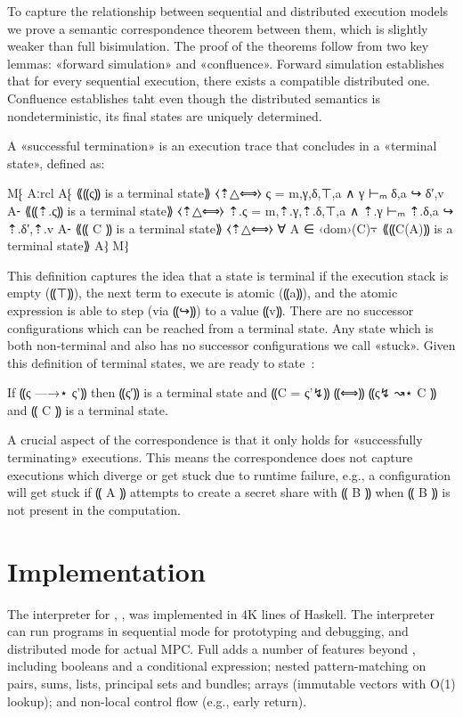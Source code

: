 To capture the relationship between sequential and distributed execution
models we prove a semantic correspondence theorem between them, which is
slightly weaker than full bisimulation. The proof of the theorems follow
from two key lemmas: «forward simulation» and «confluence». Forward simulation
establishes that for every sequential execution, there exists a compatible distributed
one. Confluence establishes taht even though the distributed semantics is nondeterministic,
its final states are uniquely determined.

A «successful termination» is an execution trace that
concludes in a «terminal state», defined as:

M⁅ Aːrcl
   A⁅ ⟪⸨ς⸩ is a terminal state⟫   ⧼⇡△⟺⧽ ς = m,γ,δ,⊤,a ∧ γ ⊢ₘ δ,a ↪ δ′,v
   A⁃ ⟪⸨⇡.ς⸩ is a terminal state⟫ ⧼⇡△⟺⧽ ⇡.ς = m,⇡.γ,⇡.δ,⊤,a ∧ ⇡.γ ⊢ₘ ⇡.δ,a ↪ ⇡.δ′,⇡.v
   A⁃ ⟪⸨ C ⸩ is a terminal state⟫   ⧼⇡△⟺⧽ ∀ A ∈ ‹dom›(C)⍪ ⟪⸨C(A)⸩ is a terminal state⟫
   A⁆
   M⁆

This definition captures the idea that a state is terminal if the execution
stack is empty (⸨⊤⸩), the next term to execute is atomic (⸨a⸩), and the
atomic expression is able to step (via ⸨↪⸩) to a value ⸨v⸩.
There are no successor configurations which can be reached from a terminal state. Any
state which is both non-terminal and also has no successor configurations we
call «stuck». Given this definition of terminal states, we are ready to
state~:

\begin{theorem}\label{thm:mpc-simulation}
  If ⸨ς —→⋆ ς'⸩ then ⸨ς′⸩ is a terminal state and ⸨C = ς'↯⸩ ⸨⟺⸩ ⸨ς↯ ↝⋆ C ⸩ and ⸨ C ⸩ is a terminal state.
\end{theorem}

A crucial aspect of the correspondence is that it only
holds for «successfully terminating» executions. This means the correspondence
 does not capture executions which diverge or get stuck due to runtime failure,
 e.g., a configuration will get stuck if ⸨ A ⸩ attempts to create a secret share
 with ⸨ B ⸩ when ⸨ B ⸩ is not present in the computation.

\section{Implementation}
\label{sec:mpc-impl}

The interpreter for \mpc, \system, was implemented in 4K lines of Haskell. The
interpreter can run programs in sequential mode for prototyping and debugging,
and distributed mode for actual MPC\@.
%
Full \system adds a number of features beyond \mpc, including booleans and a conditional
expression; nested pattern-matching on pairs, sums, lists, principal
sets and bundles;
arrays (immutable vectors with O(1) lookup); and
non-local control flow (e.g., early return).

